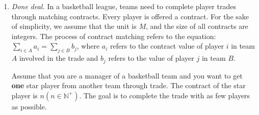 \documentclass[12pt,a4paper]{article}
\theoremstyle{definition}
\begin{document}
\begin{enumerate}
	\item \textit{Done deal.} In a basketball league, teams need to complete player trades through matching contracts. Every player is offered a contract. For the sake of simplicity, we assume that the unit is $ M $, and the size of all contracts are integers. The process of contract matching refers to the equation: $ \sum_{i\in A} a_{i}=\sum_{j\in B} b_{j} $, where $ a_{i} $ refers to the contract value of player $ i $ in team $A$ involved in the trade and $ b_{j} $ refers to the value of player $ j $ in team $B$. 
	
	Assume that you are a manager of a basketball team and you want to get \textbf{one} star player from another team through trade. The contract of the star player is $ n (n\in \mathbb{N}^+) $. The goal is to complete the trade with as few players as possible. 
	

\end{enumerate}
\end{document}
